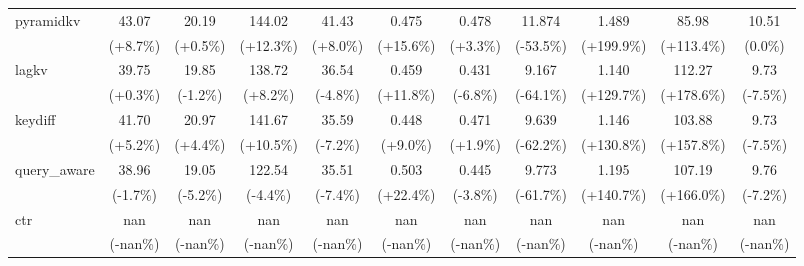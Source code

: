 \begin{table}[t]
{\begin{tabular}{l|cccccccccc}
    pyramidkv & 43.07 & 20.19 & 144.02 & 41.43 & 0.475 & 0.478 & 11.874 & 1.489 & 85.98 & 10.51 \\
     & {\tiny\color{red!70!black}(+8.7\%)} & {\tiny\color{red!70!black}(+0.5\%)} & {\tiny\color{red!70!black}(+12.3\%)} & {\tiny\color{red!70!black}(+8.0\%)} & {\tiny\color{red!70!black}(+15.6\%)} & {\tiny\color{red!70!black}(+3.3\%)} & {\tiny\color{green!60!black}(-53.5\%)} & {\tiny\color{red!70!black}(+199.9\%)} & {\tiny\color{green!60!black}(+113.4\%)} & {\tiny\color{gray}(0.0\%)} \\
    lagkv & 39.75 & 19.85 & 138.72 & 36.54 & 0.459 & 0.431 & 9.167 & 1.140 & 112.27 & 9.73 \\
     & {\tiny\color{red!70!black}(+0.3\%)} & {\tiny\color{green!60!black}(-1.2\%)} & {\tiny\color{red!70!black}(+8.2\%)} & {\tiny\color{green!60!black}(-4.8\%)} & {\tiny\color{red!70!black}(+11.8\%)} & {\tiny\color{green!60!black}(-6.8\%)} & {\tiny\color{green!60!black}(-64.1\%)} & {\tiny\color{red!70!black}(+129.7\%)} & {\tiny\color{green!60!black}(+178.6\%)} & {\tiny\color{green!60!black}(-7.5\%)} \\
    keydiff & 41.70 & 20.97 & 141.67 & 35.59 & 0.448 & 0.471 & 9.639 & 1.146 & 103.88 & 9.73 \\
     & {\tiny\color{red!70!black}(+5.2\%)} & {\tiny\color{red!70!black}(+4.4\%)} & {\tiny\color{red!70!black}(+10.5\%)} & {\tiny\color{green!60!black}(-7.2\%)} & {\tiny\color{red!70!black}(+9.0\%)} & {\tiny\color{red!70!black}(+1.9\%)} & {\tiny\color{green!60!black}(-62.2\%)} & {\tiny\color{red!70!black}(+130.8\%)} & {\tiny\color{green!60!black}(+157.8\%)} & {\tiny\color{green!60!black}(-7.5\%)} \\
    query\_aware & 38.96 & 19.05 & 122.54 & 35.51 & 0.503 & 0.445 & 9.773 & 1.195 & 107.19 & 9.76 \\
     & {\tiny\color{green!60!black}(-1.7\%)} & {\tiny\color{green!60!black}(-5.2\%)} & {\tiny\color{green!60!black}(-4.4\%)} & {\tiny\color{green!60!black}(-7.4\%)} & {\tiny\color{red!70!black}(+22.4\%)} & {\tiny\color{green!60!black}(-3.8\%)} & {\tiny\color{green!60!black}(-61.7\%)} & {\tiny\color{red!70!black}(+140.7\%)} & {\tiny\color{green!60!black}(+166.0\%)} & {\tiny\color{green!60!black}(-7.2\%)} \\
    ctr & nan & nan & nan & nan & nan & nan & nan & nan & nan & nan \\
     & {\tiny\color{green!60!black}(-nan\%)} & {\tiny\color{green!60!black}(-nan\%)} & {\tiny\color{green!60!black}(-nan\%)} & {\tiny\color{green!60!black}(-nan\%)} & {\tiny\color{green!60!black}(-nan\%)} & {\tiny\color{green!60!black}(-nan\%)} & {\tiny\color{green!60!black}(-nan\%)} & {\tiny\color{green!60!black}(-nan\%)} & {\tiny\color{red!70!black}(-nan\%)} & {\tiny\color{green!60!black}(-nan\%)} \\

\end{tabular}}
\end{table}
